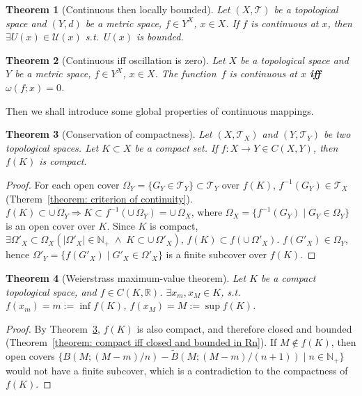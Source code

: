 \documentclass[openany]{book}
\theoremstyle{plain}
\newtheorem{theorem}{Theorem}[section] %
\theoremstyle{definition}
\newcommand{\emphbf}[1]{\emph{\textbf{#1}}}
\begin{document}
\begin{theorem}[Continuous then locally bounded]
	Let $(X, \mathscr T)$ be a topological space and $(Y, d)$ be a metric space, $f \in Y^X$, $x \in X$. 
	If $f$ is continuous at $x$, then $\exists U(x) \in \mathscr U(x)$ s.t.\ $U(x)$ is bounded.
\end{theorem}

\begin{theorem}[Continuous iff oscillation is zero]
		\label{theorem: continuous iff oscillation is zero}
	Let $X$ be a topological space and $Y$ be a metric space, $f \in Y^X$, $x \in X$. 
	The function~$f$ is continuous at $x$ \emphbf{iff} $\omega(f; x) = 0$. 	
\end{theorem}

Then we shall introduce some global properties of continuous mappings.

\begin{theorem}[Conservation of compactness]
		\label{theorem: conservation of compactness}
	Let $(X, \mathscr T_X)$ and $(Y, \mathscr T_Y)$ be two topological spaces. 
	Let $K \subset X$ be a compact set. 
	If $f \colon X \to Y \in C(X, Y)$, then $f(K)$ is compact.
\end{theorem}
\begin{proof}
	For each open cover $\Omega_Y = \{ G_Y \in \mathscr T_Y\} \subset \mathscr T_Y$ over $f( K)$, $f^{-1} ( G_Y) \in \mathscr T_X$ (Therem~\ref{theorem: criterion of continuity}). $f( K) \subset \cup\,\Omega_Y \Rightarrow K \subset f^{-1} \left(  \cup\,\Omega_Y \right) = \cup\,\Omega_X $, where $\Omega_X = \{ f^{-1} ( G_Y) \mid G_Y \in \Omega_Y\} $ is an open cover over $K$. Since $K$ is compact,
	$\exists \Omega'_X \subset \Omega_X\left( 
	\lvert \Omega'_X \rvert \in \mathbb{N}_+ 
	\;\wedge\;K\subset \cup\,\Omega'_X
	\right)$, $f( K) \subset f ( \cup\,\Omega'_X) $. $f ( G'_X) \in \Omega_Y$, hence $\Omega'_Y = \{ f ( G'_X) \mid G'_X \in \Omega'_X\}$ is a finite subcover over $f( K)$.
\end{proof}


\begin{theorem}[Weierstrass maximum-value theorem]
	\label{theorem: Weierstrass maximum-value}
	Let $K$ be a compact topological space, and $f \in C (K, \mathbb R)$.
	$\exists x_m, x_M \in K$, s.t.\ $f(x_m) = m := \inf f(K)$, $f(x_M) = M := \sup f(K)$.
\end{theorem}
\begin{proof}
	By Theorem~\ref{theorem: conservation of compactness}, $f(K)$ is also compact, and therefore closed and bounded (Theorem~\ref{theorem: compact iff closed and bounded in Rn}). 
	If $M \notin f(K)$, then open covers $\{ B(M; (M-m)/n) - \tilde B(M; (M-m)/(n + 1)) \mid  n \in \mathbb N_+\} $ would not have a finite subcover, which is a contradiction to the compactness of $f(K)$.
\end{proof}
\end{document}

